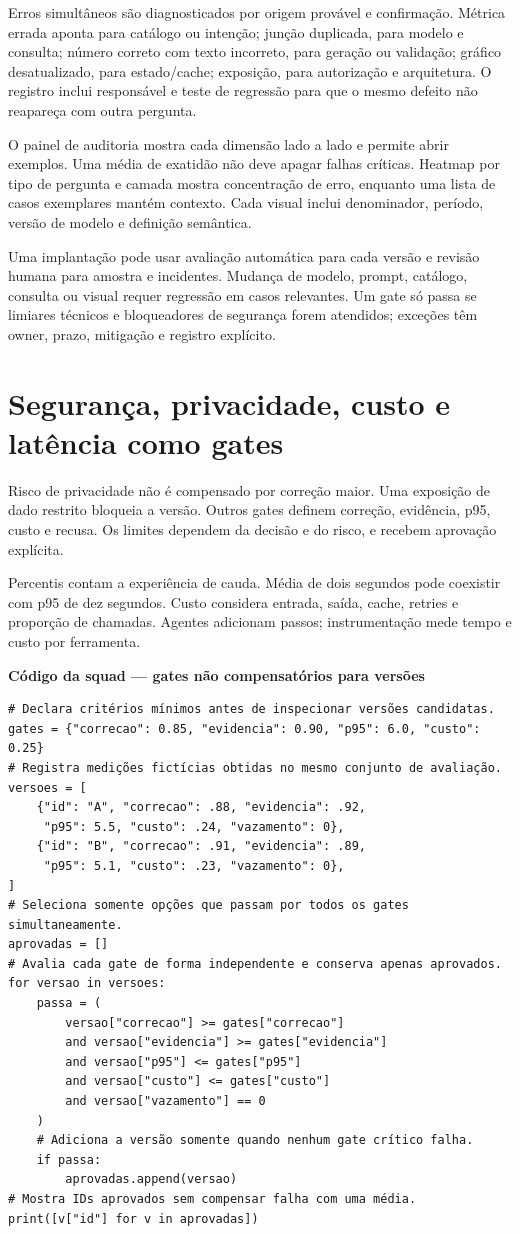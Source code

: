 Erros simultâneos são diagnosticados por origem provável e confirmação. Métrica errada aponta para catálogo ou intenção; junção duplicada, para modelo e consulta; número correto com texto incorreto, para geração ou validação; gráfico desatualizado, para estado/cache; exposição, para autorização e arquitetura. O registro inclui responsável e teste de regressão para que o mesmo defeito não reapareça com outra pergunta.

O painel de auditoria mostra cada dimensão lado a lado e permite abrir exemplos. Uma média de exatidão não deve apagar falhas críticas. Heatmap por tipo de pergunta e camada mostra concentração de erro, enquanto uma lista de casos exemplares mantém contexto. Cada visual inclui denominador, período, versão de modelo e definição semântica.

Uma implantação pode usar avaliação automática para cada versão e revisão humana para amostra e incidentes. Mudança de modelo, prompt, catálogo, consulta ou visual requer regressão em casos relevantes. Um gate só passa se limiares técnicos e bloqueadores de segurança forem atendidos; exceções têm owner, prazo, mitigação e registro explícito.

\section{Segurança, privacidade, custo e latência como gates}

Risco de privacidade não é compensado por correção maior. Uma exposição de dado restrito bloqueia a versão. Outros gates definem correção, evidência, p95, custo e recusa. Os limites dependem da decisão e do risco, e recebem aprovação explícita.

Percentis contam a experiência de cauda. Média de dois segundos pode coexistir com p95 de dez segundos. Custo considera entrada, saída, cache, retries e proporção de chamadas. Agentes adicionam passos; instrumentação mede tempo e custo por ferramenta.

\textbf{Código da squad --- gates não compensatórios para versões}
\begin{verbatim}
# Declara critérios mínimos antes de inspecionar versões candidatas.
gates = {"correcao": 0.85, "evidencia": 0.90, "p95": 6.0, "custo": 0.25}
# Registra medições fictícias obtidas no mesmo conjunto de avaliação.
versoes = [
    {"id": "A", "correcao": .88, "evidencia": .92,
     "p95": 5.5, "custo": .24, "vazamento": 0},
    {"id": "B", "correcao": .91, "evidencia": .89,
     "p95": 5.1, "custo": .23, "vazamento": 0},
]
# Seleciona somente opções que passam por todos os gates simultaneamente.
aprovadas = []
# Avalia cada gate de forma independente e conserva apenas aprovados.
for versao in versoes:
    passa = (
        versao["correcao"] >= gates["correcao"]
        and versao["evidencia"] >= gates["evidencia"]
        and versao["p95"] <= gates["p95"]
        and versao["custo"] <= gates["custo"]
        and versao["vazamento"] == 0
    )
    # Adiciona a versão somente quando nenhum gate crítico falha.
    if passa:
        aprovadas.append(versao)
# Mostra IDs aprovados sem compensar falha com uma média.
print([v["id"] for v in aprovadas])
\end{verbatim}

